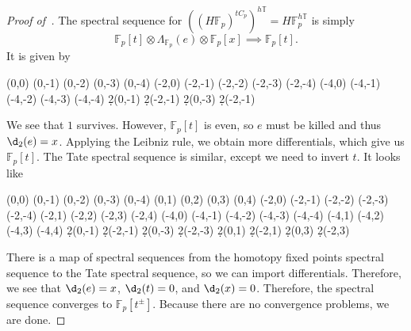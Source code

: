 \documentclass[10pt, oneside]{memoir}
\theoremstyle{definition}
\theoremstyle{remark}
\theoremstyle{plain}
\theoremstyle{definition}
\theoremstyle{remark}
\newcommand{\F}{\mathbb{F}}
\newcommand{\T}{\mathbb{T}}
\newcommand{\1}{\mathbf{1}}
\newcommand{\2}{\mathbf{2}}
\newcommand{\3}{\mathbf{3}}
\begin{document}
\begin{proof}[Proof of~]
    The spectral sequence for \(((H\F_p)^{t C_p})^{h\T} = H\F_p^{h\T} \) is simply
    \[ \F_p[t] \otimes \Lambda_{\F_p}(e) \otimes \F_p[x] \implies \F_p[t]. \]
    It is given by
    \begin{center}
        \begin{sseqdata}[classes=fill, class labels={right=0.2em}, name=hfpht, homological Serre
            grading, xscale=1, y axis gap = 2em, axes type = frame] 
            \class["1"](0,0)
            \class["e"](0,-1) 
            \class["t"](0,-2)
            \class["et"](0,-3)
            \class["t^2"](0,-4)
            \class["x"](-2,0) 
            \class(-2,-1) 
            \class(-2,-2) 
            \class(-2,-3) 
            \class(-2,-4) 
            \class["x^2"](-4,0) 
            \class(-4,-1) 
            \class(-4,-2) 
            \class(-4,-3) 
            \class(-4,-4) 
            \d2(0,-1)
            \d2(-2,-1)
            \d2(0,-3)
            \d2(-2,-1)
        \end{sseqdata} 
        \printpage[name=hfpht, page=2]
    \end{center}
    We see that \(1 \) survives. However, \(\F_p[t] \) is even, so \(e \) must be killed and thus \(\d_2(e) = x \). Applying the Leibniz rule, we obtain more differentials, which give us \(\F_p[t] \). The Tate spectral sequence is similar, except we need to invert \(t \). It looks like
    \begin{center}
        \begin{sseqdata}[classes=fill, class labels={right=0.2em}, name=tfpht, homological Serre
            grading, xscale=1, y axis gap = 2em, axes type = frame] 
            \class["1"](0,0)
            \class["e"](0,-1) 
            \class["t"](0,-2)
            \class["et"](0,-3)
            \class["t^2"](0,-4)
            \class["et^{-1}"](0,1) 
            \class["t^{-1}"](0,2)
            \class["et^{-2}"](0,3)
            \class["t^{-2}"](0,4)
            \class["x"](-2,0) 
            \class(-2,-1) 
            \class(-2,-2) 
            \class(-2,-3) 
            \class(-2,-4)
            \class(-2,1) 
            \class(-2,2) 
            \class(-2,3) 
            \class(-2,4) 
            \class["x^2"](-4,0) 
            \class(-4,-1) 
            \class(-4,-2) 
            \class(-4,-3) 
            \class(-4,-4) 
            \class(-4,1) 
            \class(-4,2) 
            \class(-4,3) 
            \class(-4,4) 
            \d2(0,-1)
            \d2(-2,-1)
            \d2(0,-3)
            \d2(-2,-3)
            \d2(0,1)
            \d2(-2,1)
            \d2(0,3)
            \d2(-2,3)
        \end{sseqdata} 
        \printpage[name=tfpht, page=2]
    \end{center}
    There is a map of spectral sequences from the homotopy fixed points spectral sequence to the Tate spectral sequence, so we can import differentials. Therefore, we see that \(\d_2(e) = x \), \(\d_2(t) = 0 \), and \(\d_2(x) = 0 \). Therefore, the spectral sequence converges to \(\F_p[t^{\pm}] \). Because there are no convergence problems, we are done.
\end{proof}
\end{document}
